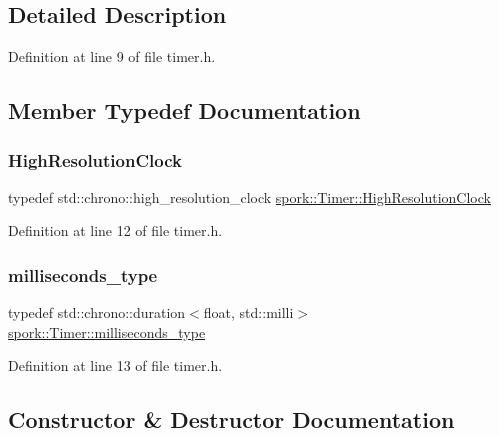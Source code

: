 \subsection{Detailed Description}


Definition at line 9 of file timer.\+h.



\subsection{Member Typedef Documentation}
\mbox{\label{classspork_1_1_timer_aa9dbba26ef2e26de57cfcd4294630387}} 
\subsubsection{\texorpdfstring{High\+Resolution\+Clock}{HighResolutionClock}}
{\footnotesize\ttfamily typedef std\+::chrono\+::high\+\_\+resolution\+\_\+clock \hyperlink{classspork_1_1_timer_aa9dbba26ef2e26de57cfcd4294630387}{spork\+::\+Timer\+::\+High\+Resolution\+Clock}\hspace{0.3cm}{\ttfamily [private]}}



Definition at line 12 of file timer.\+h.

\mbox{\label{classspork_1_1_timer_a2d684c0b32609e7ee0864f1ce5cc7396}} 
\subsubsection{\texorpdfstring{milliseconds\+\_\+type}{milliseconds\_type}}
{\footnotesize\ttfamily typedef std\+::chrono\+::duration$<$float, std\+::milli$>$ \hyperlink{classspork_1_1_timer_a2d684c0b32609e7ee0864f1ce5cc7396}{spork\+::\+Timer\+::milliseconds\+\_\+type}\hspace{0.3cm}{\ttfamily [private]}}



Definition at line 13 of file timer.\+h.



\subsection{Constructor \& Destructor Documentation}
\mbox{\label{classspork_1_1_timer_a0c5bc9a1d6bbf58b3f5268f699cdcb90}} 
